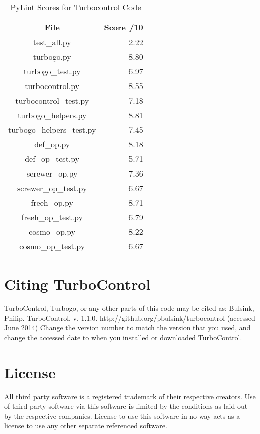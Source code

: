 \begin{table}[!h]
  \centering
  \caption{PyLint Scores for Turbocontrol Code}
    \begin{tabular}{cr}
    \toprule
    File  & Score /10 \\
    \midrule
    test\_all.py & 2.22 \\
    turbogo.py & 8.80 \\
    turbogo\_test.py & 6.97 \\
    turbocontrol.py & 8.55 \\
    turbocontrol\_test.py & 7.18 \\
    turbogo\_helpers.py & 8.81 \\
    turbogo\_helpers\_test.py & 7.45 \\
    def\_op.py & 8.18 \\
    def\_op\_test.py & 5.71 \\
    screwer\_op.py & 7.36 \\
    screwer\_op\_test.py & 6.67 \\
    freeh\_op.py & 8.71 \\
    freeh\_op\_test.py & 6.79 \\
    cosmo\_op.py & 8.22 \\
    cosmo\_op\_test.py & 6.67 \\
    \bottomrule
    \end{tabular}%
  \label{tab.pylint}
\end{table}%

\section{Citing TurboControl}

TurboControl, Turbogo, or any other parts of this code may be cited as:
Bulsink, Philip. TurboControl, v. 1.1.0. http://github.org/pbulsink/turbocontrol (accessed June 2014)
Change the version number to match the version that you used, and change the accessed date to when you installed or downloaded TurboControl. 

\section{License}

All third party software is a registered trademark of their respective
creators. Use of third party software via this software is limited by
the conditions as laid out by the respective companies. License to use
this software in no way acts as a license to use any other separate
referenced software.

